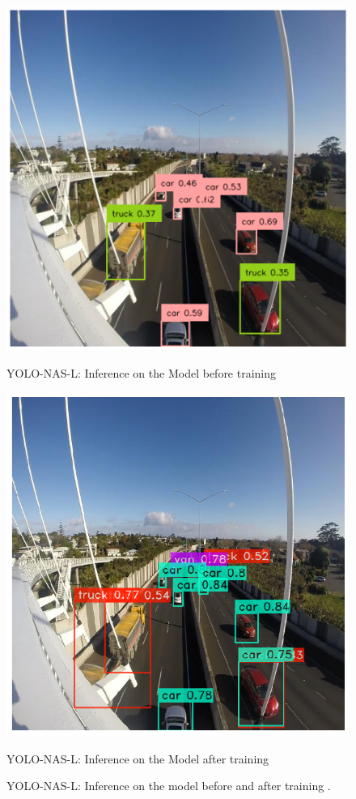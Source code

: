 \begin{figure}[H]
  \begin{minipage}{0.48\textwidth}
    \centering
    \includegraphics[width=\linewidth]{tex/img/L-before_training.png}
    \caption{YOLO-NAS-L: Inference 
    on the Model before training}
    \label{fig:YOLO-NASSL_vs_other_models}
  \end{minipage}%
  \begin{minipage}{0.5\textwidth}
    \centering
    \includegraphics[width=\linewidth]{tex/img/L-after_training.png}
    \caption{YOLO-NAS-L: Inference on the Model after training}
    \label{fig:YOLO-NAS_vs_other_models}
  \end{minipage}
  \caption{YOLO-NAS-L: Inference on the model before and  after training .}
\end{figure}


